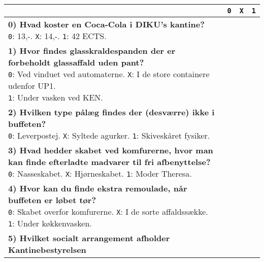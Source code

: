 \begin{center}
\begin{tabular}{|p{12cm}|p{0.2cm}|p{0.2cm}|p{0.2cm}|}
\hline
\vspace{0.2cm}
& \texttt{0} & \texttt{X} & \texttt{1} \\\hline
\parbox{12cm}{
  \vspace{0.2cm}
  \textbf{0) Hvad koster en Coca-Cola i DIKU's kantine?} \\
  \texttt{0}: 13,-. \quad
  \texttt{X}: 14,-. \quad
  \texttt{1}: 42 ECTS.
  \vspace{0.1cm}
} & & & \\\hline
\parbox{12cm}{
  \vspace{0.2cm}
  \textbf{1) Hvor findes glasskraldespanden der er forbeholdt glassaffald
  uden pant?} \\
  \texttt{0}: Ved vinduet ved automaterne. \quad
  \texttt{X}: I de store containere udenfor UP1. \\
  \texttt{1}: Under vasken ved KEN.
  \vspace{0.1cm}
} & & & \\\hline
\parbox{12cm}{
  \vspace{0.2cm}
  \textbf{2) Hvilken type pålæg findes der (desværre) ikke i buffeten?} \\
  \texttt{0}: Leverpostej. \quad
  \texttt{X}: Syltede agurker. \quad
  \texttt{1}: Skiveskåret fysiker.
  \vspace{0.1cm}
} & & & \\\hline
\parbox{12cm}{
  \vspace{0.2cm}
  \textbf{3) Hvad hedder skabet ved komfurerne, hvor man kan finde
  efterladte madvarer til fri afbenyttelse?} \\
  \texttt{0}: Nasseskabet. \quad
  \texttt{X}: Hjørneskabet. \quad
  \texttt{1}: Moder Theresa.
  \vspace{0.1cm}
} & & & \\\hline
\parbox{12cm}{
  \vspace{0.2cm}
  \textbf{4) Hvor kan du finde ekstra remoulade, når buffeten
  er løbet tør?}\\
  \texttt{0}: Skabet overfor komfurerne. \quad
  \texttt{X}: I de sorte affaldssække. \\
  \texttt{1}: Under køkkenvasken.
  \vspace{0.1cm}
} & & & \\\hline
\parbox{12cm}{
  \vspace{0.2cm}
  \textbf{5) Hvilket socialt arrangement afholder Kantinebestyrelsen
}}
\end{tabular}
\end{center}
